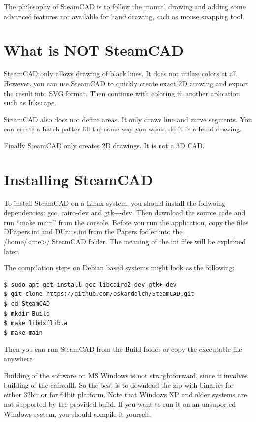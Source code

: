 The philosophy of SteamCAD is to follow the manual drawing and adding some advanced features
not available for hand drawing, such as mouse snapping tool.

\section{What is NOT SteamCAD}

SteamCAD only allows drawing of black lines. It does not utilize colors at all. However, you can
use SteamCAD to quickly create exact 2D drawing and export the result into SVG format. Then
continue with coloring in another aplication such as Inkscape.

SteamCAD also does not define areas. It only draws line and curve segments. You can create a
hatch patter fill the same way you would do it in a hand drawing.

Finally SteamCAD only creates 2D drawings. It is not a 3D CAD.

\section{Installing SteamCAD}

To install SteamCAD on a Linux system, you should install the follwoing dependencies: gcc, cairo-dev
and gtk+-dev. Then download the source code and run ``make main'' from the console. Before you run
the application, copy the files DPapers.ini and DUnits.ini from the Papers fodler into the
/home/<me>/.SteamCAD folder. The meaning of the ini files will be explained later.

The compilation steps on Debian based systems might look as the following:
\begin{verbatim}
$ sudo apt-get install gcc libcairo2-dev gtk+-dev
$ git clone https://github.com/oskardolch/SteamCAD.git
$ cd SteamCAD
$ mkdir Build
$ make libdxflib.a
$ make main
\end{verbatim}

Then you can run SteamCAD from the Build folder or copy the executable file anywhere.

Building of the software on MS Windows is not straightforward, since it involves building of
the cairo.dll. So the best is to download the zip with binaries for either 32bit or for 64bit
platform. Note that Windows XP and older systems are not supported by the provided build. If
you want to run it on an unsuported Windows system, you should compile it yourself.

